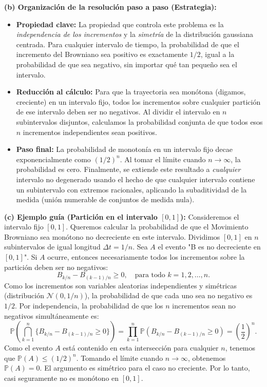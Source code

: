 \documentclass[11pt, letterpaper]{article}
\begin{document}
\begin{solucion}
    \textbf{(b) Organización de la resolución paso a paso (Estrategia):}
    \begin{itemize}
        \item[(i)] \textbf{Propiedad clave:} La propiedad que controla este problema es la \textit{independencia de los incrementos} y la \textit{simetría} de la distribución gaussiana centrada. Para cualquier intervalo de tiempo, la probabilidad de que el incremento del Browniano sea positivo es exactamente $1/2$, igual a la probabilidad de que sea negativo, sin importar qué tan pequeño sea el intervalo.
        \item[(ii)] \textbf{Reducción al cálculo:} Para que la trayectoria sea monótona (digamos, creciente) en un intervalo fijo, todos los incrementos sobre cualquier partición de ese intervalo deben ser no negativos. Al dividir el intervalo en $n$ subintervalos disjuntos, calculamos la probabilidad conjunta de que todos esos $n$ incrementos independientes sean positivos.
        \item[(iii)] \textbf{Paso final:} La probabilidad de monotonía en un intervalo fijo decae exponencialmente como $(1/2)^n$. Al tomar el límite cuando $n \to \infty$, la probabilidad es cero. Finalmente, se extiende este resultado a \textit{cualquier} intervalo no degenerado usando el hecho de que cualquier intervalo contiene un subintervalo con extremos racionales, aplicando la subaditividad de la medida (unión numerable de conjuntos de medida nula).
    \end{itemize}

    \vspace{3mm}
    \textbf{(c) Ejemplo guía (Partición en el intervalo $[0,1]$):}
    Consideremos el intervalo fijo $[0, 1]$. Queremos calcular la probabilidad de que el Movimiento Browniano sea monótono no decreciente en este intervalo.
    Dividimos $[0, 1]$ en $n$ subintervalos de igual longitud $\Delta t = 1/n$. 
    Sea $A$ el evento "B es no decreciente en $[0,1]$". Si $A$ ocurre, entonces necesariamente todos los incrementos sobre la partición deben ser no negativos:
    \[ B_{k/n} - B_{(k-1)/n} \ge 0, \quad \text{para todo } k = 1, 2, \dots, n. \]
    Como los incrementos son variables aleatorias independientes y simétricas (distribución $\mathcal{N}(0, 1/n)$), la probabilidad de que cada uno sea no negativo es $1/2$.
    Por independencia, la probabilidad de que los $n$ incrementos sean no negativos simultáneamente es:
    \[ \mathbb{P}\left( \bigcap_{k=1}^n \{ B_{k/n} - B_{(k-1)/n} \ge 0 \} \right) = \prod_{k=1}^n \mathbb{P}(B_{k/n} - B_{(k-1)/n} \ge 0) = \left(\frac{1}{2}\right)^n. \]
    Como el evento $A$ está contenido en esta intersección para cualquier $n$, tenemos que $\mathbb{P}(A) \le (1/2)^n$. Tomando el límite cuando $n \to \infty$, obtenemos $\mathbb{P}(A) = 0$. El argumento es simétrico para el caso no creciente. Por lo tanto, casi seguramente no es monótono en $[0,1]$.


\end{solucion}
\end{document}
